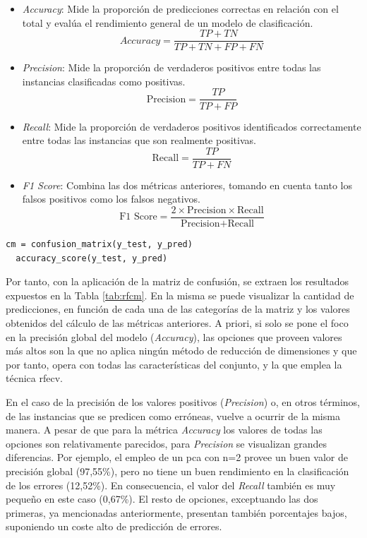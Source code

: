 \begin{itemize}
  \item \textit{Accuracy}: Mide la proporción de predicciones correctas en relación con el total y evalúa el rendimiento general de un modelo de clasificación.
  \[\textit{Accuracy} = \frac{{TP + TN}}{{TP + TN + FP + FN}}\]
  \item \textit{Precision}: Mide la proporción de verdaderos positivos entre todas las instancias clasificadas como positivas.
  \[\text{Precision} = \frac{{TP}}{{TP + FP}}\]
  \item \textit{Recall}: Mide la proporción de verdaderos positivos identificados correctamente entre todas las instancias que son realmente positivas. 
  \[\text{Recall} = \frac{{TP}}{{TP + FN}}\]
  \item \textit{F1 Score}: Combina las dos métricas anteriores, tomando en cuenta tanto los falsos positivos como los falsos negativos.
  \[\text{F1 Score} = \frac{{2 \times \text{Precision} \times \text{Recall}}}{{\text{Precision} + \text{Recall}}}\]
\end{itemize}

\begin{lstlisting}[style=Python, caption={Implementación de la matriz de confusión}]
  cm = confusion_matrix(y_test, y_pred)
  accuracy_score(y_test, y_pred)
\end{lstlisting}

\vspace{3mm}

Por tanto, con la aplicación de la matriz de confusión, se extraen los resultados expuestos en la Tabla \ref{tab:rfcm}. En la misma se puede visualizar la cantidad de predicciones, en función de cada una de las categorías de la matriz y los valores obtenidos del cálculo de las métricas anteriores. A priori, si solo se pone el foco en la precisión global del modelo (\textit{Accuracy}), las opciones que proveen valores más altos son la que no aplica ningún método de reducción de dimensiones y que por tanto, opera con todas las características del conjunto, y la que emplea la técnica \gls{rfecv}. 

\vspace{3mm}

En el caso de la precisión de los valores positivos (\textit{Precision}) o, en otros términos, de las instancias que se predicen como erróneas, vuelve a ocurrir de la misma manera. A pesar de que para la métrica \textit{Accuracy} los valores de todas las opciones son relativamente parecidos, para \textit{Precision} se visualizan grandes diferencias. Por ejemplo, el empleo de un \gls{pca} con n=2 provee un buen valor de precisión global (97,55\%), pero no tiene un buen rendimiento en la clasificación de los errores (12,52\%). En consecuencia, el valor del \textit{Recall} también es muy pequeño en este caso (0,67\%). El resto de opciones, exceptuando las dos primeras, ya mencionadas anteriormente, presentan también porcentajes bajos, suponiendo un coste alto de predicción de errores. 

